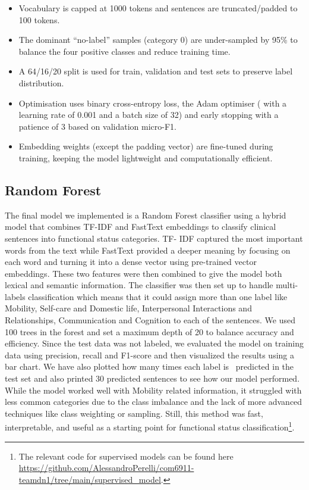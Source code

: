 \begin{itemize}
    \item Vocabulary is capped at 1000 tokens and sentences are truncated/padded to 100 tokens.
    \item The dominant “no-label” samples (category 0) are under-sampled by 95\% to balance the four positive classes and reduce training time.
    \item A 64/16/20 split is used for train, validation and test sets to preserve label distribution.
    \item Optimisation uses binary cross-entropy loss, the Adam optimiser ( with a learning rate of 0.001 and a batch size of 32) and early stopping with a patience of 3 based on validation micro-F1.
    \item Embedding weights (except the padding vector) are fine-tuned during training, keeping the model lightweight and computationally efficient.
\end{itemize}

\subsection{Random Forest}
The final model we implemented is a Random Forest classifier using a hybrid model that combines TF-IDF and FastText embeddings to classify clinical sentences into functional status categories. TF- IDF captured the most important words from the text while FastText provided a deeper meaning by focusing on each word and turning it into a dense vector using pre-trained vector embeddings. These two features were then combined to give the model both lexical and semantic information. The classifier was then set up to handle multi-labels classification which means that it could assign more than one label like Mobility, Self-care and Domestic life, Interpersonal Interactions and Relationships, Communication and Cognition to each of the sentences. We used 100 trees in the forest and set a maximum depth of 20 to balance accuracy and efficiency. Since the test data was not labeled, we evaluated the model on training data using precision, recall and F1-score and then visualized the results using a bar chart. We have also plotted how many times each label is  predicted in the test set and also printed 30 predicted sentences to see how our model performed. While the model worked well with Mobility related information, it struggled with less common categories due to the class imbalance and the lack of more advanced techniques like class weighting or sampling. Still, this method was fast, interpretable, and useful as a starting point for functional status classification\footnote{The relevant code for supervised models can be found here \url{https://github.com/AlessandroPerelli/com6911-teamdn1/tree/main/supervised_model}.}. \medskip


